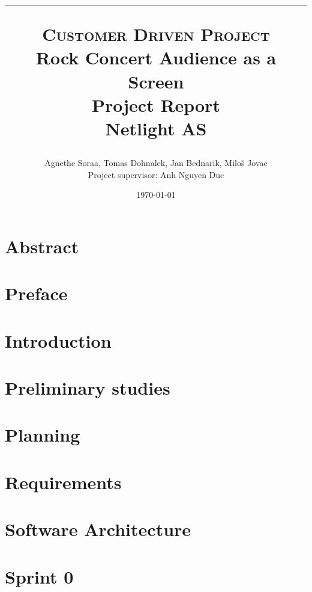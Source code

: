 \documentclass[11pt]{report}
\title{
	\hrule
    \normalsize \textsc{Customer Driven Project}\\
    \Huge Rock Concert Audience as a Screen\\[10pt]
    \normalsize Project Report\\[10pt]
    Netlight AS
    \horrule{2pt}
    }
\author{Agnethe Soraa,
Tomas Dohnalek,
Jan Bednarik,
Miloš Jovac \\
\normalsize Project supervisor: Anh Nguyen Duc}
\date{\today}
\begin{document}
\maketitle
\chapter*{Abstract}


\chapter*{Preface}


\tableofcontents
\setcounter{page}{3}

\chapter{Introduction}


\chapter{Preliminary studies}


\chapter{Planning} \label{txt:planning}


\chapter{Requirements}


%

\chapter{Software Architecture}


\chapter{Sprint 0}

\end{document}
